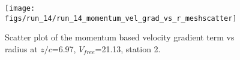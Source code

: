\begin{figure}[H]
\centering
\texttt{[image: figs/run\_14/run\_14\_momentum\_vel\_grad\_vs\_r\_meshscatter]}
\caption{Scatter plot of the momentum based velocity gradient term vs radius at $z/c$=6.97, $V_{free}$=21.13, station 2.}
\label{fig:run_14_momentum_vel_grad_vs_r_meshscatter}
\end{figure}


